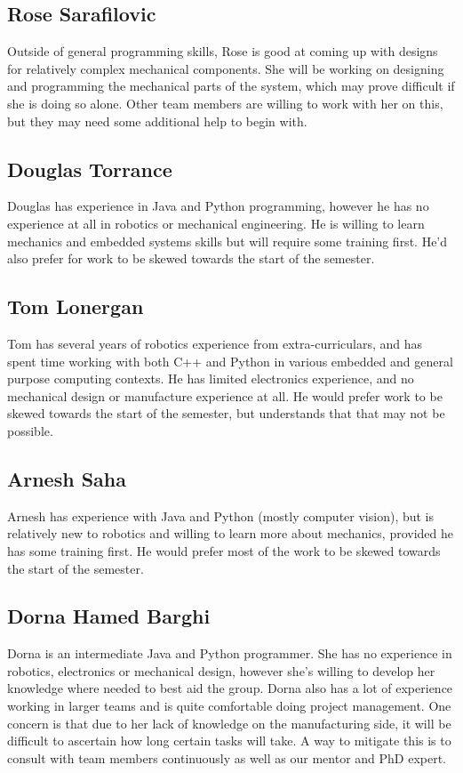 \documentclass{article}
\begin{document}
\subsection{Rose Sarafilovic}
Outside of general programming skills, Rose is good at coming up with designs for relatively complex mechanical components. She will be working on designing and programming the mechanical parts of the system, which may prove difficult if she is doing so alone. Other team members are willing to work with her on this, but they may need some additional help to begin with. 

\subsection{Douglas Torrance}
Douglas has experience in Java and Python programming, however he has no experience at all in robotics or mechanical engineering. He is willing to learn mechanics and embedded systems skills but will require some training first. He'd also prefer for work to be skewed towards the start of the semester. 

\subsection{Tom Lonergan}
Tom has several years of robotics experience from extra-curriculars, and has spent time working with both C++ and Python in various embedded and general purpose computing contexts. He has limited electronics experience, and no mechanical design or manufacture experience at all. He would prefer work to be skewed towards the start of the semester, but understands that that may not be possible.

\subsection{Arnesh Saha}
Arnesh has experience with Java and Python (mostly computer vision), but is relatively new to robotics and willing to learn more about mechanics, provided he has some training first. He would prefer most of the work to be skewed towards the start of the semester.

\subsection{Dorna Hamed Barghi}
Dorna is an intermediate Java and Python programmer. She has no experience in robotics, electronics or mechanical design, however she's willing to develop her knowledge where needed to best aid the group. Dorna also has a lot of experience working in larger teams and is quite comfortable doing project management. One concern is that due to her lack of knowledge on the manufacturing side, it will be difficult to ascertain how long certain tasks will take. A way to mitigate this is to consult with team members continuously as well as our mentor and PhD expert. 
\end{document}

